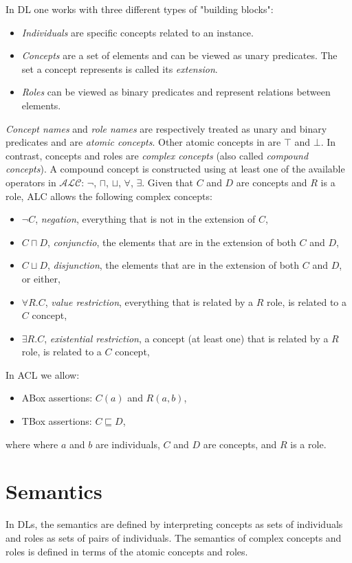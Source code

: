 In DL one works with three different types of "building blocks":
\begin{itemize}
    \item \textit{Individuals} are specific concepts related to an instance.
    \item \textit{Concepts} are a set of elements and can be viewed as unary predicates. The set a concept represents is called its \textit{extension}.
    \item \textit{Roles} can be viewed as binary predicates and represent relations between elements.
\end{itemize}
\textit{Concept names} and \textit{role names} are respectively treated as unary and binary predicates and are \textit{atomic concepts}. Other atomic concepts in  are $\top$ and $\bot$. In contrast, concepts and roles are \textit{complex concepts} (also called \textit{compound concepts}). A compound concept is constructed using at least one of the available operators in $\mathcal{ALC}$: $\neg$, $\sqcap$, $\sqcup$, $\forall$, $\exists$. Given that $C$ and $D$ are concepts and $R$ is a role, ALC allows the following complex concepts:
\begin{itemize}
    \item $\neg C$, \textit{negation}, everything that is not in the extension of $C$,
    \item $C\sqcap D$, \textit{conjunctio}, the elements that are in the extension of both $C$ and $D$,
    \item $C\sqcup D$, \textit{disjunction}, the elements that are in the extension of both $C$ and $D$, or either,
    \item $\forall R.C$, \textit{value restriction}, everything that is related by a $R$ role, is related to a $C$ concept,
    \item $\exists R.C$, \textit{existential restriction}, a concept (at least one) that is related by a $R$ role, is related to a $C$ concept,
\end{itemize}

In ACL we allow:
\begin{itemize}
    \item ABox assertions: $C(a)$ and $R(a, b)$,
    \item TBox assertions: $C \sqsubseteq D$,
\end{itemize}
where where $a$ and $b$ are individuals, $C$ and $D$ are concepts, and $R$ is a role.

\section{Semantics}
In DLs, the semantics are defined by interpreting concepts as sets of individuals and roles as sets of pairs of individuals. The semantics of complex concepts and roles is defined in terms of the atomic concepts and roles.


